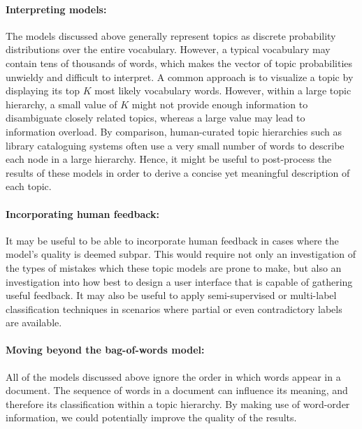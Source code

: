 \documentclass{article}
\begin{document}
\paragraph{Interpreting models:}
The models discussed above generally represent topics as discrete probability distributions over the entire vocabulary.
However, a typical vocabulary may contain tens of thousands of words, which makes the vector of topic probabilities unwieldy and difficult to interpret.
A common approach is to visualize a topic by displaying its top $K$ most likely vocabulary words.
However, within a large topic hierarchy, a small value of $K$ might not provide enough information to disambiguate closely related topics, whereas a large value may lead to information overload.
By comparison, human-curated topic hierarchies such as library cataloguing systems often use a very small number of words to describe each node in a large hierarchy.
Hence, it might be useful to post-process the results of these models in order to derive a concise yet meaningful description of each topic.

\paragraph{Incorporating human feedback:}
It may be useful to be able to incorporate human feedback in cases where the model's quality is deemed subpar.
This would require not only an investigation of the types of mistakes which these topic models are prone to make, but also an investigation into how best to design a user interface that is capable of gathering useful feedback.
It may also be useful to apply semi-supervised or multi-label classification techniques in scenarios where partial or even contradictory labels are available.

\paragraph{Moving beyond the bag-of-words model:}
All of the models discussed above ignore the order in which words appear in a document.
The sequence of words in a document can influence its meaning, and therefore its classification within a topic hierarchy.
By making use of word-order information, we could potentially improve the quality of the results.

\end{document}
